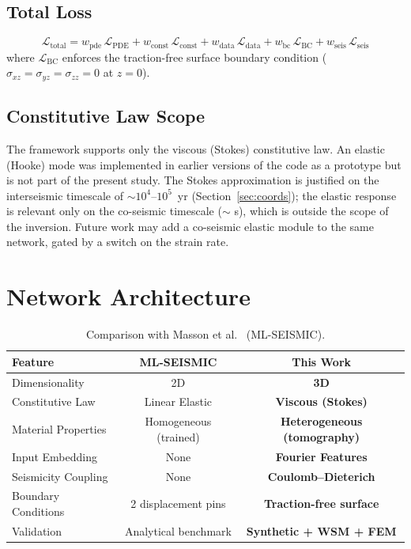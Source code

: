 \documentclass[11pt, a4paper]{article}
\begin{document}
\subsection{Total Loss}
\begin{equation}
    \mathcal{L}_{\text{total}} = w_{\text{pde}}\,\mathcal{L}_{\text{PDE}} + w_{\text{const}}\,\mathcal{L}_{\text{const}} + w_{\text{data}}\,\mathcal{L}_{\text{data}} + w_{\text{bc}}\,\mathcal{L}_{\text{BC}} + w_{\text{seis}}\,\mathcal{L}_{\text{seis}}
    \label{eq:total_loss}
\end{equation}
where $\mathcal{L}_{\text{BC}}$ enforces the traction-free surface boundary condition ($\sigma_{xz} = \sigma_{yz} = \sigma_{zz} = 0$ at $z = 0$).

\subsection{Constitutive Law Scope}
The framework supports only the viscous (Stokes) constitutive law. An elastic (Hooke) mode was implemented in earlier versions of the code as a prototype but is not part of the present study. The Stokes approximation is justified on the interseismic timescale of $\sim 10^4$--$10^5$~yr (Section~\ref{sec:coords}); the elastic response is relevant only on the co-seismic timescale ($\sim$ s), which is outside the scope of the inversion. Future work may add a co-seismic elastic module to the same network, gated by a switch on the strain rate.

\section{Network Architecture}

\begin{table}[h!]
\centering
\caption{Comparison with Masson et al.\ \cite{Masson2023} (ML-SEISMIC).}
\begin{tabular}{lcc}
\toprule
\textbf{Feature} & \textbf{ML-SEISMIC} & \textbf{This Work} \\
\midrule
Dimensionality & 2D & \textbf{3D} \\
Constitutive Law & Linear Elastic & \textbf{Viscous (Stokes)} \\
Material Properties & Homogeneous (trained) & \textbf{Heterogeneous (tomography)} \\
Input Embedding & None & \textbf{Fourier Features} \\
Seismicity Coupling & None & \textbf{Coulomb--Dieterich} \\
Boundary Conditions & 2 displacement pins & \textbf{Traction-free surface} \\
Validation & Analytical benchmark & \textbf{Synthetic + WSM + FEM} \\
\bottomrule
\end{tabular}
\label{tab:comparison}
\end{table}
\end{document}
